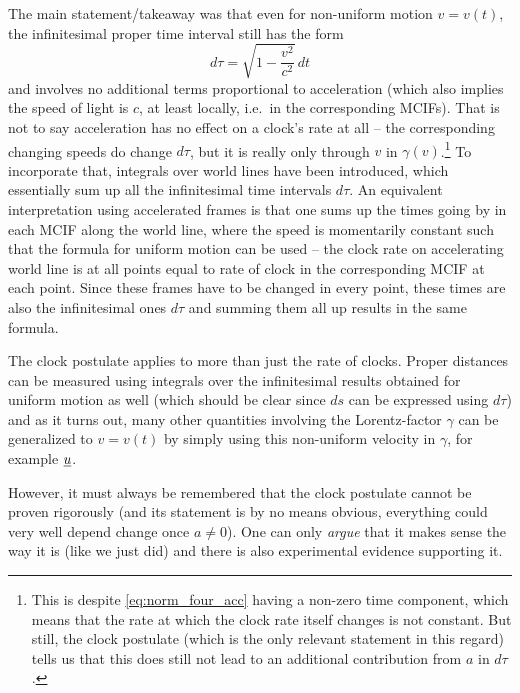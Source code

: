 \documentclass[../relativity_main.tex]{subfiles}
\begin{document}
The main statement/takeaway was that even for non-uniform motion $v = v(t)$, the infinitesimal proper time interval still has the form
\begin{equation*}
	d\tau = \sqrt{1 - \frac{v^2}{c^2}} \, dt
\end{equation*}
and involves no additional terms proportional to acceleration (which also implies the speed of light is $c$, at least locally, i.e.~in the corresponding MCIFs). That is not to say acceleration has no effect on a clock's rate at all -- the corresponding changing speeds do change $d\tau$, but it is really only through $v$ in $\gamma(v)$.\footnote{This is despite \eqref{eq:norm_four_acc} having a non-zero time component, which means that the rate at which the clock rate itself changes is not constant. But still, the clock postulate (which is the only relevant statement in this regard) tells us that this does still not lead to an additional contribution from $a$ in $d\tau$.} To incorporate that, integrals over world lines have been introduced, which essentially sum up all the infinitesimal time intervals $d\tau$. An equivalent interpretation using accelerated frames is that one sums up the times going by in each MCIF along the world line, where the speed is momentarily constant such that the formula for uniform motion can be used -- the clock rate on accelerating world line is at all points equal to rate of clock in the corresponding MCIF at each point. Since these frames have to be changed in every point, these times are also the infinitesimal ones $d\tau$ and summing them all up results in the same formula.


The clock postulate applies to more than just the rate of clocks. Proper distances can be measured using integrals over the infinitesimal results obtained for uniform motion as well (which should be clear since $ds$ can be expressed using $d\tau$) and as it turns out, many other quantities involving the Lorentz-factor $\gamma$ can be generalized to $v = v(t)$ by simply using this non-uniform velocity in $\gamma$, for example $\underline{u}$.


However, it must always be remembered that the clock postulate cannot be proven rigorously (and its statement is by no means obvious, everything could very well depend change once $a \neq 0$). One can only \emph{argue} that it makes sense the way it is (like we just did) and there is also experimental evidence supporting it.



\end{document}
